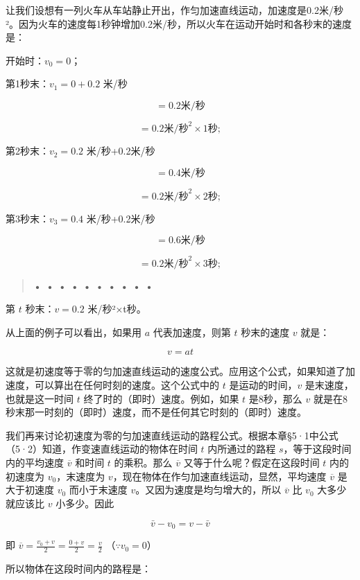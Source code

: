让我们设想有一列火车从车站静止开出，作匀加速直线运动，加速度是0.2米/秒²。因为火车的速度每1秒钟增加0.2米/秒，所以火车在运动开始时和各秒末的速度是：

开始时：\(v_{0}=0\)；

第1秒末：\(v_{1}=0+0.2\) 米/秒

\[
= 0.2 \text{米} / \text{秒}
\]

\[
= 0.2 \text{米} / \text{秒} ^ {2} \times 1 \text{秒};
\]

第2秒末：\(v_{2}=0.2\) 米/秒+0.2米/秒

\[
= 0.4 \text{米} / \text{秒}
\]

\[
= 0.2 \text{米} / \text{秒} ^ {2} \times 2 \text{秒};
\]

第3秒末：\(v_{3}=0.4\) 米/秒+0.2米/秒

\[
= 0.6 \text{米} / \text{秒}
\]

\[
= 0.2 \text{米} / \text{秒} ^ {2} \times 3 \text{秒};
\]

\begin{quote}
\textbf{• • • • • • • • • •}
\end{quote}

第 \(t\) 秒末：\(v = 0.2\) 米/秒²×t秒。

从上面的例子可以看出，如果用 \(a\) 代表加速度，则第 \(t\) 秒末的速度
\(v\) 就是：

\[
v = a t \tag {5.4}
\]

这就是初速度等于零的匀加速直线运动的速度公式。应用这个公式，如果知道了加速度，可以算出在任何时刻的速度。这个公式中的
\(t\) 是运动的时间，\(v\) 是末速度，也就是这一时间 \(t\)
终了时的（即时）速度。例如，如果 \(t\) 是8秒，那么 \(v\)
就是在8秒末那一时刻的（即时）速度，而不是任何其它时刻的（即时）速度。

我们再来讨论初速度为零的匀加速直线运动的路程公式。根据本章§5·1中公式（5·2）知道，作变速直线运动的物体在时间
\(t\) 内所通过的路程 \(s\)，等于这段时间内的平均速度 \(\overline{v}\)
和时间 \(t\) 的乘积。那么 \(\overline{v}\) 又等于什么呢？假定在这段时间
\(t\) 内的初速度为 \(v_0\)，末速度为
\(v\)，现在物体在作匀加速直线运动，显然，平均速度 \(\overline{v}\)
是大于初速度 \(v_0\) 而小于末速度 \(v\)。又因为速度是均匀增大的，所以
\(\overline{v}\) 比 \(v_0\) 大多少就应该比 \(v\) 小多少。因此

\[
\bar {v} - v _ {0} = v - \bar {v}
\]

即 \(\overline{v} = \frac{v_0 + v}{2} = \frac{0 + v}{2} = \frac{v}{2}\)
（\(\because v_0 = 0\)）

所以物体在这段时间内的路程是：

